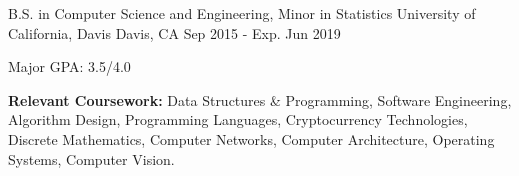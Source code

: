 

\begin{cventries}
  \cventry
    {B.S. in Computer Science and Engineering, Minor in Statistics} %
    {University of California, Davis} %
    {Davis, CA} %
    {Sep 2015 - Exp. Jun 2019} %
    {
      \begin{cvitems} %
        \item {Major GPA: 3.5/4.0}
      \end{cvitems}
    }
\end{cventries}

\begin{cvparagraph}
  \textbf{Relevant Coursework: } Data Structures \& Programming, Software Engineering, Algorithm Design, Programming Languages, Cryptocurrency Technologies, Discrete Mathematics, Computer Networks, Computer Architecture, Operating Systems, Computer Vision.
\end{cvparagraph}

